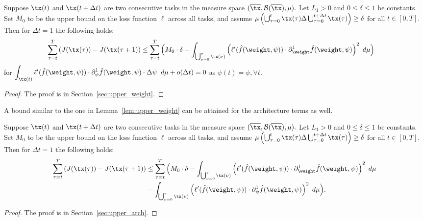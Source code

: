 \begin{lemma}\label{lem:upper_weight}
    Suppose $\tx(t)$ and $\tx(t+\Delta t)$ are two consecutive tasks in the measure space $(\overline{\tx}, \mathcal{B}(\overline{\tx}),\mu).$ Let $L_1>0$ and $0\leq \delta\leq 1$  be constants. Set $M_0$ to be the upper bound on the loss function $\ell$ across all tasks, and assume $\mu\left( \bigcup_{\tau = 0}^{t}\tx(\tau)\Delta \bigcup_{\tau = 0}^{t+\Delta t}\tx(\tau)\right)\geq \delta$ for all $t\in [0,T].$ Then for $\Delta t = 1$ the following holds:
    \begin{align*}
        \sum_{\tau = t}^{T} \left(J(\tx(\tau))-J(\tx(\tau+1)\right)
        & \leq \sum_{\tau =t}^{T} \Big( M_0\cdot \delta - \displaystyle\int_{\bigcup_{\nu = 0}^\tau\tx(\nu)} \left(\ell'(\hat{f}(\weight,\psi))\cdot \partial_{\weight}^1 \hat{f}(\weight,\psi)\right)^2 \hspace{1mm}  d\mu \Big)
    \end{align*}
    for $\displaystyle\int_{\tx(t)} \ell'(\hat{f}(\weight,\psi))\cdot \partial_\psi^1 \hat{f}(\weight,\psi)\cdot \Delta \psi \; \;  d\mu+ o(\Delta t) = 0$ as $\psi(t) = \psi, \forall t.$
\end{lemma}
\begin{proof}
    The proof is in Section~\ref{sec:upper_weight}.
\end{proof}
A bound similar to the one in Lemma~\ref{lem:upper_weight} can be attained for the architecture terms as well. 
\begin{lemma}\label{lem:upper_arch}
    Suppose $\tx(t)$ and $\tx(t+\Delta t)$ are two consecutive tasks in the measure space $(\overline{\tx}, \mathcal{B}(\overline{\tx}),\mu).$ Let $L_1>0$ and $0\leq \delta\leq 1$  be constants. Set $M_0$ to be the upper bound on the loss function $\ell$ across all tasks, and assume $\mu\left( \bigcup_{\tau = 0}^{t}\tx(\tau)\Delta \bigcup_{\tau = 0}^{t+\Delta t}\tx(\tau)\right)\geq \delta$ for all $t\in [0,T].$ Then for $\Delta t = 1$ the following holds:
    \begin{align*}
        \sum_{\tau = t}^{T} \left(J(\tx(\tau))-J(\tx(\tau+1)\right)
        & \leq \sum_{\tau =t}^{T} \Big( M_0\cdot \delta - \displaystyle\int_{\bigcup_{\nu = 0}^\tau\tx(\nu)} \left(\ell'(\hat{f}(\weight,\psi))\cdot \partial_{\weight}^1 \hat{f}(\weight,\psi)\right)^2 \hspace{1mm}  d\mu\\
        & -\displaystyle\int_{\bigcup_{\nu = 0}^\tau\tx(\nu)} \left(\ell'(\hat{f}(\weight,\psi))\cdot \partial_\psi^1 \hat{f}(\weight,\psi)\right)^2\hspace{1mm}  d\mu\Big).
    \end{align*}
\end{lemma}
\begin{proof}
    The proof is  in Section~\ref{sec:upper_arch}.
\end{proof}

